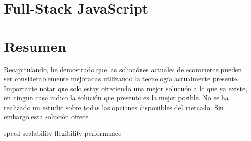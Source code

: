 \section{Full-Stack JavaScript}




\section{Resumen}
Recapitulando, he demostrado que las soluciónes actuales de ecommerce pueden ser considerablemente mejoradas utilizando la tecnología actualmente presente. 
Importante notar que solo estoy ofreciendo una mejor solucuón a lo que ya existe, en ningun caso indico la solución que presento es la mejor posible. No se ha realizado un estudio sobre todas las opciones disponibles del mercado. Sin embargo esta solución ofrece

speed
scalability
flexibility
performance
